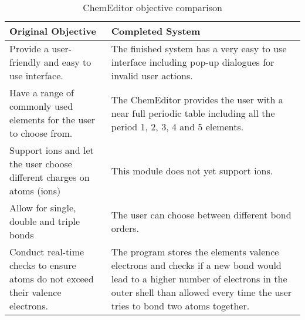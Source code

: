 \documentclass[a4paper,12pt]{article}
\begin{document}
\begin{table}[htbp]
\centering
\begin{tabularx}{\textwidth}{|X|X|}
\hline
\textbf{Original Objective} & \textbf{Completed System}\\

\hline

Provide a user-friendly and easy to use interface. & \cellcolor{cyan!70} The finished system has a very easy to use interface including pop-up dialogues for invalid user actions. \\

\hline

Have a range of commonly used elements for the user to choose from. & \cellcolor{green!70} The ChemEditor provides the user with a near full periodic table including all the period 1, 2, 3, 4 and 5 elements. \\

\hline

Support ions and let the user choose different charges on atoms (ions) & \cellcolor{red!70} This module does not yet support ions. \\

\hline

Allow for single, double and triple bonds & \cellcolor{cyan!70} The user can choose between different bond orders. \\

\hline

Conduct real-time checks to ensure atoms do not exceed their valence electrons.  & \cellcolor{cyan!70} The program stores the elements valence electrons and checks if a new bond would lead to a higher number of electrons in the outer shell than allowed every time the user tries to bond two atoms together. \\

\hline


\end{tabularx}
\caption{ChemEditor objective comparison}
\label{tab:editor_objective_comp}
\end{table}
\end{document}
